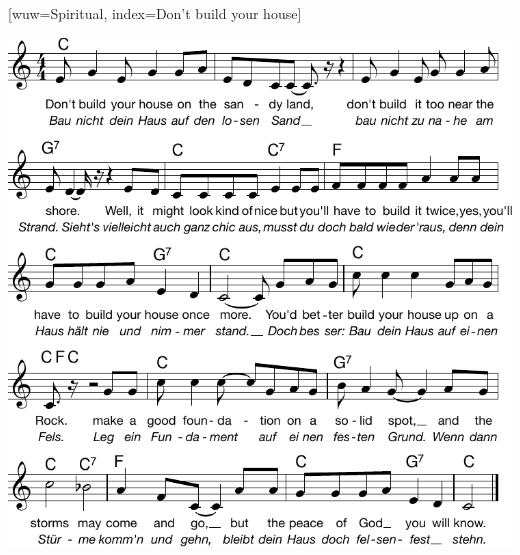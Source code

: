 [wuw={Spiritual}, index={Don't build your house}]


\beginverse
\endverse
\centering\includegraphics[width=1\textwidth]{Noten/Lied116.pdf}

\endsong
